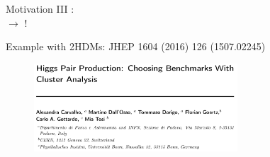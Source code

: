 %
\begin{frame}{Motivation III}
	\large
	: \\[1ex]
	 $\longrightarrow$ !
	
	\bigskip
    \bigskip
	Example with 2HDMs: JHEP 1604 (2016) 126 {\footnotesize(1507.02245)}
    \begin{figure}
        \centering
    	\includegraphics[height=3.3cm]{figures/scrot/2hdm_paper.png}
    \end{figure}
    
\end{frame}
%
